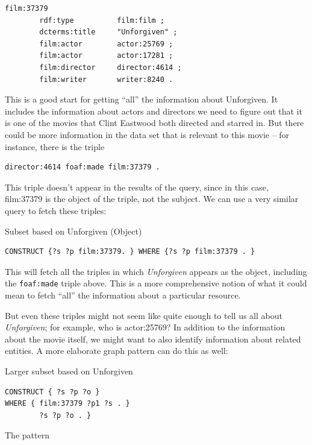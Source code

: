 \begin{challenge}
\begin{lstlisting}
film:37379  
        rdf:type          film:film ;
        dcterms:title     "Unforgiven" ;
        film:actor        actor:25769 ;
        film:actor        actor:17281 ;
        film:director     director:4614 ;
        film:writer       writer:8240 .
\end{lstlisting}

This is a good start for getting ``all'' the information about
Unforgiven. It includes the information about actors and directors we
need to figure out that it is one of the movies that Clint Eastwood both
directed and starred in. But there could be more information in the data
set that is relevant to this movie -- for instance, there is the triple

\begin{lstlisting}
director:4614 foaf:made film:37379 .
\end{lstlisting}

This triple doesn't appear in the results of the query, since in this
case, film:37379 is the object of the triple, not the subject. We can
use a very similar query to fetch these triples:

\begin{query}Subset based on Unforgiven (Object)\end{query}
\begin{lstlisting}
CONSTRUCT {?s ?p film:37379. } WHERE {?s ?p film:37379 . }
\end{lstlisting}

This will fetch all the triples in which \emph{Unforgiven} appears as
the object, including the \texttt{foaf:made} triple above. This is a more
comprehensive notion of what it could mean to fetch ``all'' the
information about a particular resource.

But even these triples might not seem like quite enough to tell us all
about \emph{Unforgiven}; for example, who is actor:25769? In addition to
the information about the movie itself, we might want to also identify
information about related entities. A more elaborate graph pattern can
do this as well:

\begin{query}Larger subset based on Unforgiven\end{query}
\begin{lstlisting}
CONSTRUCT { ?s ?p ?o }
WHERE { film:37379 ?p1 ?s . }
        ?s ?p ?o . }
\end{lstlisting}

The pattern


\end{challenge}
